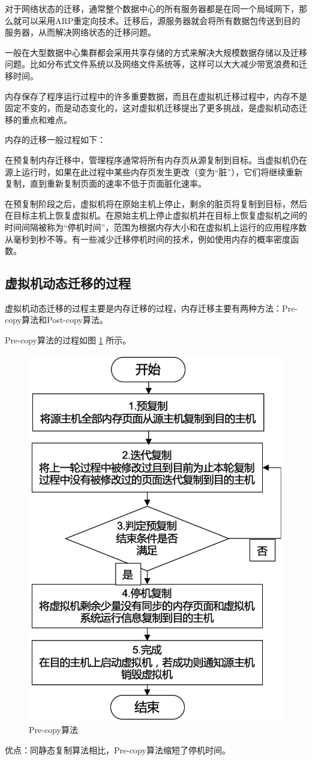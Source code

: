 对于网络状态的迁移，通常整个数据中心的所有服务器都是在同一个局域网下，那么就可以采用ARP重定向技术。迁移后，源服务器就会将所有数据包传送到目的服务器，从而解决网络状态的迁移问题。
           
一般在大型数据中心集群都会采用共享存储的方式来解决大规模数据存储以及迁移问题。比如分布式文件系统以及网络文件系统等，这样可以大大减少带宽浪费和迁移时间。

内存保存了程序运行过程中的许多重要数据，而且在虚拟机迁移过程中，内存不是固定不变的，而是动态变化的，这对虚拟机迁移提出了更多挑战，是虚拟机动态迁移的重点和难点。

内存的迁移一般过程如下：

在预复制内存迁移中，管理程序通常将所有内存页从源复制到目标。当虚拟机仍在源上运行时，如果在此过程中某些内存页发生更改（变为“脏”），它们将继续重新复制，直到重新复制页面的速率不低于页面脏化速率。

在预复制阶段之后，虚拟机将在原始主机上停止，剩余的脏页将复制到目标，然后在目标主机上恢复虚拟机。在原始主机上停止虚拟机并在目标上恢复虚拟机之间的时间间隔被称为“停机时间”，范围为根据内存大小和在虚拟机上运行的应用程序数从毫秒到秒不等。有一些减少迁移停机时间的技术，例如使用内存的概率密度函数。

\subsection{虚拟机动态迁移的过程}
虚拟机动态迁移的过程主要是内存迁移的过程，内存迁移主要有两种方法：Pre-copy算法和Post-copy算法\cite{Aidan}。

Pre-copy算法的过程如图 \ref{Fig:chap2_2} 所示。

\begin{figure}[!htb]
  \centering
  \includegraphics[width=0.3\linewidth]{./Figure/IMG_Chap2_2.png}
  \caption{Pre-copy算法}\label{Fig:chap2_2}
\end{figure}

优点：同静态复制算法相比，Pre-copy算法缩短了停机时间。

